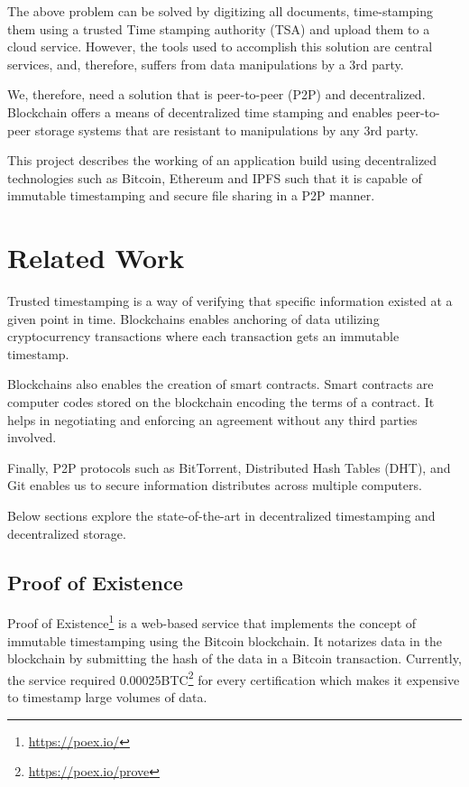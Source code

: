 \documentclass[]{article}
\begin{document}
		The above problem can be solved by digitizing all documents, time-stamping them using a trusted Time stamping authority (TSA) and upload them to a cloud service. However, the tools used to accomplish this solution are central services, and, therefore, suffers from data manipulations by a 3rd party.
		
		We, therefore, need a solution that is peer-to-peer (P2P) and decentralized. Blockchain offers a means of decentralized time stamping and enables peer-to-peer storage systems that are resistant to manipulations by any 3rd party.
		
		This project describes the working of an application build using decentralized technologies such as Bitcoin\cite{nakamoto2008bitcoin}, Ethereum\cite{buterin2014next} and IPFS\cite{benet2014ipfs} such that it is capable of immutable timestamping and secure file sharing in a P2P manner.
		
	\newpage
	\section{Related Work}
		Trusted timestamping is a way of verifying that specific information existed at a given point in time. Blockchains enables anchoring of data utilizing cryptocurrency transactions where each transaction gets an immutable timestamp. 
		
		Blockchains also enables the creation of smart contracts. Smart contracts are computer codes stored on the blockchain encoding the terms of a contract. It helps in negotiating and enforcing an agreement without any third parties involved.
		
		Finally, P2P protocols such as BitTorrent\cite{levin2008bittorrent}, Distributed Hash Tables (DHT), and Git enables us to secure information distributes across multiple computers.
		
		Below sections explore the state-of-the-art in decentralized timestamping and decentralized storage.
		
		
		\subsection{Proof of Existence}
			Proof of Existence\footnote{\url{https://poex.io/}} is a web-based service that implements the concept of immutable timestamping using the Bitcoin blockchain. It notarizes data in the blockchain by submitting the hash of the data in a Bitcoin transaction. Currently, the service required 0.00025BTC\footnote{\url{https://poex.io/prove}} for every certification which makes it expensive to timestamp large volumes of data.
			
\end{document}

